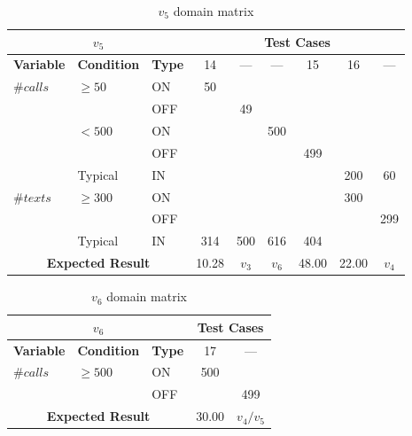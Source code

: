 %
  {\protect\numberline{}}
\begin{table}[!htbp]
  \centering
  \begin{tabular}{|*{3}{l|}*{6}{c|}}
    \hline
    \multicolumn{3}{|c|}{$v_5$}
    & \multicolumn{6}{|c|}{\textbf{Test Cases}} \\ \hline
    \textbf{Variable} & \textbf{Condition} & \textbf{Type}
                                &  14   &  ---  &  ---  &  15   &  16   &  ---  \\ \hline
    $\#calls$ & $\ge 50$  & ON  &  50   &       &       &       &       &       \\ \cline{3-9}
              &           & OFF &       &  49   &       &       &       &       \\ \cline{2-9}
              & $< 500$   & ON  &       &       &  500  &       &       &       \\ \cline{3-9}
              &           & OFF &       &       &       &  499  &       &       \\ \cline{2-9}
              & Typical   & IN  &       &       &       &       &  200  &  60   \\ \hline
    $\#texts$ & $\ge 300$ & ON  &       &       &       &       &  300  &       \\ \cline{3-9}
              &           & OFF &       &       &       &       &       &  299  \\ \cline{2-9}
              & Typical   & IN  &  314  &  500  &  616  &  404  &       &       \\ \hline
    \multicolumn{3}{|c|}{\textbf{Expected Result}}
                                & 10.28 & $v_3$ & $v_6$ & 48.00 & 22.00 & $v_4$ \\ \hline
  \end{tabular}
  \caption{$v_5$ domain matrix}
  \label{tab:methods.computeBill.matrices.v5}
\end{table}

%
  {\protect\numberline{}}
\begin{table}[!htbp]
  \centering
  \begin{tabular}{|*{3}{l|}*{2}{c|}}
    \hline
    \multicolumn{3}{|c|}{$v_6$}
    & \multicolumn{2}{|c|}{\textbf{Test Cases}} \\ \hline
    \textbf{Variable} & \textbf{Condition} & \textbf{Type}
                                &  17   &    ---    \\ \hline
    $\#calls$ & $\ge 500$ & ON  &  500  &           \\ \cline{3-5}
              &           & OFF &       &    499    \\ \hline
    \multicolumn{3}{|c|}{\textbf{Expected Result}}
                                & 30.00 & $v_4/v_5$ \\ \hline
  \end{tabular}
  \caption{$v_6$ domain matrix}
  \label{tab:methods.computeBill.matrices.v6}
\end{table}
\clearpage